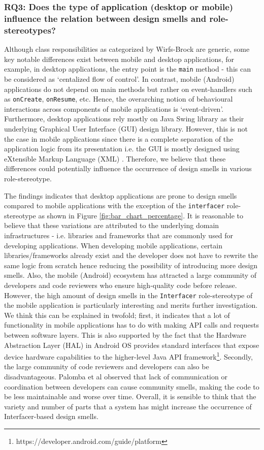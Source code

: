 \documentclass[AMA,Times1COL]{WileyNJDv5} %
\begin{document}
	\subsubsection*{RQ3: Does the type of application (desktop or mobile) influence the relation between design smells and role-stereotypes?}
	Although class responsibilities as categorized by Wirfs-Brock\cite{wirfs2006characterizing} are generic, some key notable differences exist between mobile and desktop applications, for example, in desktop applications, the entry point is the {\tt main} method - this can be considered as `centalized flow of control'. In contrast, mobile (Android) applications do not depend on main methods but rather on event-handlers such as {\tt onCreate}, {\tt onResume}, etc. Hence, the overarching notion of behavioural interactions across components of mobile applications is `event-driven'.
	Furthermore,  desktop applications rely mostly on Java Swing library as their underlying Graphical User Interface (GUI) design library. However, this is not the case in mobile applications since there is a complete separation of the application logic from its presentation i.e. the  GUI  is mostly designed using eXtensible  Markup  Language (XML) \cite{mannan2016understanding}. Therefore, we believe that these differences could potentially influence the occurrence of design smells in various role-stereotype.
	
	The findings indicates that desktop applications are prone to design smells compared to mobile applications with the exception of the {\tt interfacer} role-stereotype as shown in Figure \ref{fig:bar_chart_percentage}. It is reasonable to believe that these variations are attributed to the underlying domain infrastructures - i.e. libraries and frameworks that are commonly used for developing applications. When developing mobile applications, certain libraries/frameworks  already exist and the developer does not have to rewrite the same logic from scratch hence reducing the possibility of introducing more design smells. Also, the mobile (Android) ecosystem has attracted a large community of developers and code reviewers who ensure high-quality code before release. However, the high amount of design smells in the {\tt Interfacer} role-stereotype of the mobile application is particularly interesting and merits further investigation. We think this can be explained in twofold; first, it indicates that a lot of functionality in mobile applications has to do with making API calls and requests between software layers. This is also supported by the fact that the Hardware Abstraction Layer (HAL) in Android OS provides standard interfaces that expose device hardware capabilities to the higher-level Java API framework\footnote{https://developer.android.com/guide/platform}. Secondly, the large community of code reviewers and developers can also be disadvantageous. Palomba et al\cite{palomba2018beyond} observed that lack of communication or coordination between developers can cause community smells, making the code to be less maintainable and worse over time. Overall, it is sensible to think that the variety and number of parts that a system has might increase the occurrence of Interfacer-based design smells.
	
\end{document}
